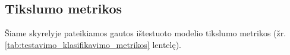 \subsection{Tikslumo metrikos}
\label{subsec:testavimo_tikslumo_metrikos}

Šiame skyrelyje pateikiamos gautos ištestuoto modelio tikslumo metrikos (žr. \ref{tab:testavimo_klasifikavimo_metrikos} lentelę).

